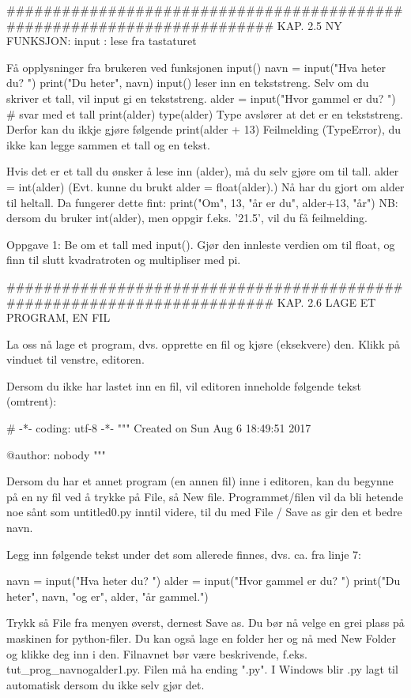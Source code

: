 ######################################################################## 
KAP. 2.5  NY FUNKSJON: input : lese fra tastaturet 

Få opplysninger fra brukeren ved funksjonen input()
navn = input("Hva heter du? ") 
print("Du heter", navn)
input() leser inn en tekststreng. 
Selv om du skriver et tall, vil input gi en tekststreng. 
alder = input("Hvor gammel er du? ")   # svar med et tall 
print(alder)
type(alder)
Type avslører at det er en tekststreng.
Derfor kan du ikkje gjøre følgende
print(alder + 13)
Feilmelding (TypeError), du ikke kan legge sammen et tall og en tekst. 

Hvis det er et tall du ønsker å lese inn (alder), må du selv gjøre om til tall. 
alder = int(alder)
(Evt. kunne du brukt alder = float(alder).)
Nå har du gjort om alder til heltall.
Da fungerer dette fint: 
print("Om", 13, "år er du", alder+13, "år") 
NB: dersom du bruker int(alder), men oppgir f.eks. '21.5', vil du få feilmelding. 


Oppgave 1: Be om et tall med input(). Gjør den innleste verdien om til float,
og finn til slutt kvadratroten og multipliser med pi. 

######################################################################## 
KAP. 2.6  LAGE ET PROGRAM, EN FIL

La oss nå lage et program, dvs. opprette en fil og kjøre (eksekvere) den. 
Klikk på vinduet til venstre, editoren. 

Dersom du ikke har lastet inn en fil, vil editoren inneholde følgende tekst (omtrent): 

# -*- coding: utf-8 -*-
"""
Created on Sun Aug  6 18:49:51 2017

@author: nobody
"""

Dersom du har et annet program (en annen fil) inne i editoren,
kan du begynne på en ny fil ved å trykke på File, så New file.
Programmet/filen vil da bli hetende noe sånt som untitled0.py inntil videre,
til du med File / Save as gir den et bedre navn. 

Legg inn følgende tekst under det som allerede finnes, dvs. ca. fra linje 7: 

navn = input("Hva heter du? ")
alder = input("Hvor gammel er du? ") 
print("Du heter", navn, "og er", alder, "år gammel.") 

Trykk så File fra menyen øverst, dernest Save as. 
Du bør nå velge en grei plass på maskinen for python-filer. 
Du kan også lage en folder her og nå med New Folder og klikke deg inn i den. 
Filnavnet bør være beskrivende, f.eks. tut_prog_navnogalder1.py. 
Filen må ha ending ".py". 
I Windows blir .py lagt til automatisk dersom du ikke selv gjør det. 


